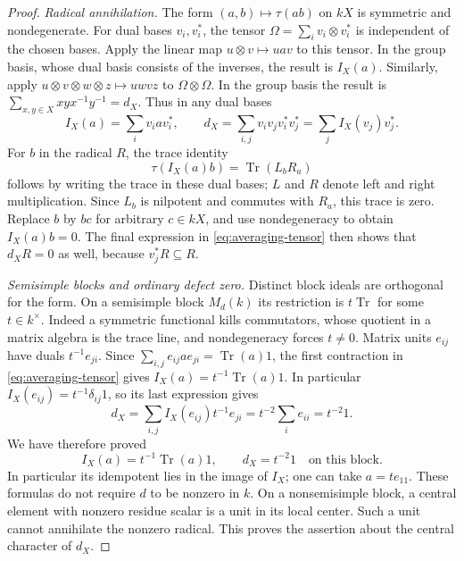 \begin{proof}
\textit{Radical annihilation.}
The form $(a,b)\mapsto\tau(ab)$ on $kX$ is symmetric and
nondegenerate. For dual bases $v_i,v_i^*$, the tensor
$\Omega=\sum_i v_i\otimes v_i^*$ is independent of the chosen
bases. Apply the linear map $u\otimes v\mapsto uav$ to this
tensor. In the group basis, whose dual basis consists of the inverses,
the result is $I_X(a)$. Similarly, apply
$u\otimes v\otimes w\otimes z\mapsto uwvz$ to
$\Omega\otimes\Omega$. In the group basis the result is
$\sum_{x,y\in X}xyx^{-1}y^{-1}=d_X$. Thus in any dual bases
\begin{equation}\label{eq:averaging-tensor}
 I_X(a)=\sum_i v_iav_i^*,\qquad
 d_X=\sum_{i,j}v_iv_jv_i^*v_j^*
     =\sum_j I_X(v_j)v_j^*.
\end{equation}
For $b$ in the radical $R$, the trace identity
\[
 \tau(I_X(a)b)=\operatorname{Tr}(L_bR_a)
\]
follows by writing the trace in these dual bases; $L$ and $R$
denote left and right multiplication. Since $L_b$ is nilpotent
and commutes with $R_a$, this trace is zero. Replace $b$ by $bc$
for arbitrary $c\in kX$, and use nondegeneracy to obtain
$I_X(a)b=0$. The final expression in
\eqref{eq:averaging-tensor} then shows that $d_XR=0$ as well,
because $v_j^*R\subseteq R$.

\textit{Semisimple blocks and ordinary defect zero.}
Distinct block ideals are orthogonal for the form. On a
semisimple block $M_d(k)$ its restriction is $t\operatorname{Tr}$
for some $t\in k^\times$. Indeed a symmetric functional kills
commutators, whose quotient in a matrix algebra is the trace line,
and nondegeneracy forces $t\ne0$. Matrix units $e_{ij}$ have duals
$t^{-1}e_{ji}$. Since
$\sum_{i,j}e_{ij}ae_{ji}=\operatorname{Tr}(a)1$, the first
contraction in \eqref{eq:averaging-tensor} gives
$I_X(a)=t^{-1}\operatorname{Tr}(a)1$. In particular
$I_X(e_{ij})=t^{-1}\delta_{ij}1$, so its last expression gives
\[
 d_X=\sum_{i,j}I_X(e_{ij})t^{-1}e_{ji}
     =t^{-2}\sum_i e_{ii}=t^{-2}1.
\]
We have therefore proved
\begin{equation}\label{eq:simple-block-scalars}
 I_X(a)=t^{-1}\operatorname{Tr}(a)1,
 \qquad d_X=t^{-2}1
 \quad\text{on this block}.
\end{equation}
In particular its idempotent lies in the image of $I_X$; one can
take $a=te_{11}$. These formulas do not require $d$ to be nonzero
in $k$. On a nonsemisimple block, a central element with nonzero
residue scalar is a unit in its local center. Such a unit cannot
annihilate the nonzero radical. This proves the assertion about
the central character of $d_X$.


\end{proof}
